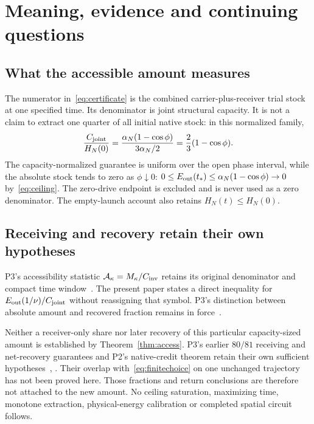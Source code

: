 \section{Meaning, evidence and continuing questions}\label{sec:interpretation}
\subsection{What the accessible amount measures}
The numerator in~\eqref{eq:certificate} is the combined carrier-plus-receiver trial stock at one specified time. Its denominator is joint structural capacity. It is not a claim to extract one quarter of all initial native stock: in this normalized family,
\begin{equation}\label{eq:initialfraction}%
\frac{C_{\rm joint}}{H_N(0)}
=\frac{\alpha_N(1-\cos\phi)}{3\alpha_N/2}
=\frac23(1-\cos\phi).
\end{equation}
The capacity-normalized guarantee is uniform over the open phase interval, while the absolute stock tends to zero as $\phi\downarrow0$:
$0\le E_{\rm out}(t_*)\le\alpha_N(1-\cos\phi)\to0$ by~\eqref{eq:ceiling}.
The zero-drive endpoint is excluded and is never used as a zero denominator. The empty-launch account also retains $H_N(t)\le H_N(0)$.

\subsection{Receiving and recovery retain their own hypotheses}\label{sec:priorlimits}%
P3's accessibility statistic $\mathcal A_\kappa=M_\kappa/C_{\rm inv}$ retains its original denominator and compact time window~\cite[Section 6.1, (6.1)--(6.2)]{p3}. The present paper states a direct inequality for $E_{\rm out}(1/\nu)/C_{\rm joint}$ without reassigning that symbol. P3's distinction between absolute amount and recovered fraction remains in force~\cite[Section 6.2, (6.3)--(6.5)]{p3}.

Neither a receiver-only share nor later recovery of this particular capacity-sized amount is established by Theorem~\ref{thm:access}. P3's earlier $80/81$ receiving and net-recovery guarantees and P2's native-credit theorem retain their own sufficient hypotheses~\cite[Section 4]{p3}, \cite[Theorem 3.1]{p2}. Their overlap with~\eqref{eq:finitechoice} on one unchanged trajectory has not been proved here. Those fractions and return conclusions are therefore not attached to the new amount.
No ceiling saturation, maximizing time, monotone extraction, physical-energy calibration or completed spatial circuit follows.

